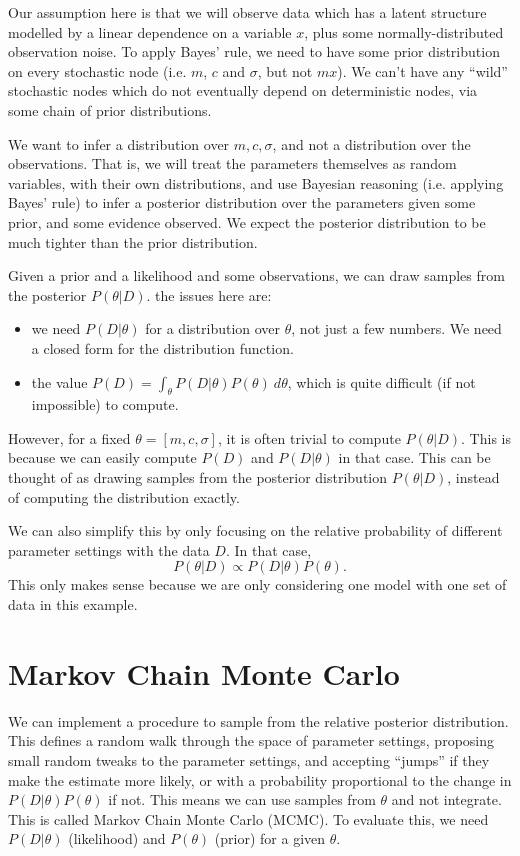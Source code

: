 \documentclass[a4paper, openany]{memoir}
\begin{document}
Our assumption here is that we will observe data which has a latent structure modelled by a linear dependence on a variable $x$, plus some normally-distributed observation noise. To apply Bayes' rule, we need to have some prior distribution on every stochastic node (i.e. $m$, $c$ and $\sigma$, but not $mx$). We can't have any ``wild'' stochastic nodes which do not eventually depend on deterministic nodes, via some chain of prior distributions.

We want to infer a distribution over $m, c, \sigma$, and not a distribution over the observations. That is, we will treat the parameters themselves as random variables, with their own distributions, and use Bayesian reasoning (i.e. applying Bayes' rule) to infer a posterior distribution over the parameters given some prior, and some evidence observed. We expect the posterior distribution to be much tighter than the prior distribution.

Given a prior and a likelihood and some observations, we can draw samples from the posterior $P(\theta|D)$. the issues here are:
\begin{itemize}
    \item we need $P(D|\theta)$ for a distribution over $\theta$, not just a few numbers. We need a closed form for the distribution function.
    \item the value $P(D) = \int_\theta P(D|\theta) P(\theta) \ d\theta$, which is quite difficult (if not impossible) to compute.
\end{itemize}
However, for a fixed $\theta = [m, c, \sigma]$, it is often trivial to compute $P(\theta|D)$. This is because we can easily compute $P(D)$ and $P(D|\theta)$ in that case. This can be thought of as drawing samples from the posterior distribution $P(\theta|D)$, instead of computing the distribution exactly.

We can also simplify this by only focusing on the relative probability of different parameter settings with the data $D$. In that case,
\[P(\theta|D) \propto P(D|\theta) P(\theta).\]
This only makes sense because we are only considering one model with one set of data in this example.
\newpage

\section{Markov Chain Monte Carlo}
We can implement a procedure to sample from the relative posterior distribution. This defines a random walk through the space of parameter settings, proposing small random tweaks to the parameter settings, and accepting ``jumps'' if they make the estimate more likely, or with a probability proportional to the change in $P(D|\theta) P(\theta)$ if not. This means we can use samples from $\theta$ and not integrate. This is called Markov Chain Monte Carlo (MCMC). To evaluate this, we need $P(D|\theta)$ (likelihood) and $P(\theta)$ (prior) for a given $\theta$.
\end{document}
